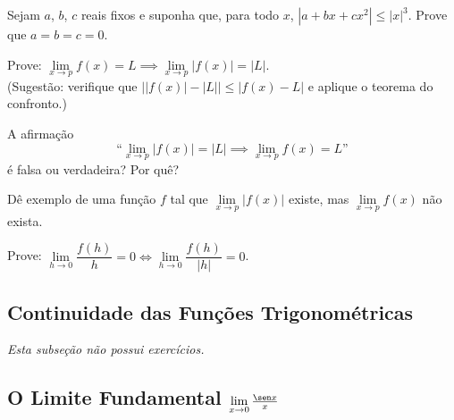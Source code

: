 \begin{exercicio}[8]
Sejam $a$, $b$, $c$ reais fixos e suponha que, para todo $x$, $|a + bx + cx^2| \le |x|^3$. Prove que $a = b = c = 0$.
\end{exercicio}

\begin{exercicio}[9]
Prove: $\lim\limits_{x \to p} f(x) = L \implies \lim\limits_{x \to p} |f(x)| = |L|$.\\
(Sugestão: verifique que $\big||f(x)| - |L|\big| \le |f(x) - L|$ e aplique o teorema do confronto.)
\end{exercicio}

\begin{exercicio}[10]
A afirmação
\[
\text{``}\lim_{x \to p} |f(x)| = |L| \implies \lim_{x \to p} f(x) = L\text{''}
\]
é falsa ou verdadeira? Por quê?
\end{exercicio}

\begin{exercicio}[11]
Dê exemplo de uma função $f$ tal que $\lim\limits_{x \to p} |f(x)|$ existe, mas $\lim\limits_{x \to p} f(x)$ não exista.
\end{exercicio}

\begin{exercicio}[12]
Prove: $\lim\limits_{h \to 0} \dfrac{f(h)}{h} = 0 \iff \lim\limits_{h \to 0} \dfrac{f(h)}{|h|} = 0$.
\end{exercicio}

\clearpage

\subsection{Continuidade das Funções Trigonométricas}
\textit{Esta subseção não possui exercícios.}

\clearpage

\subsection{O Limite Fundamental $\lim\limits_{x \to 0} \frac{\sen x}{x}$}

